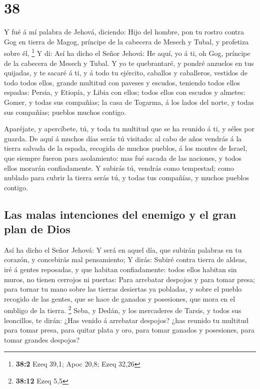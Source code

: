 \hypertarget{section-37}{%
\section{38}\label{section-37}}

 Y fué á mí palabra de Jehová, diciendo:  Hijo
del hombre, pon tu rostro contra Gog en tierra de Magog, príncipe de la
cabecera de Mesech y Tubal, y profetiza sobre él, \footnote{\textbf{38:2}
  Ezeq 39,1; Apoc 20,8; Ezeq 32,26}  Y di: Así ha dicho el
Señor Jehová: He aquí, yo á ti, oh Gog, príncipe de la cabecera de
Mesech y Tubal.  Y yo te quebrantaré, y pondré anzuelos en
tus quijadas, y te sacaré á ti, y á todo tu ejército, caballos y
caballeros, vestidos de todo todos ellos, grande multitud con paveses y
escudos, teniendo todos ellos espadas:  Persia, y Etiopía, y
Libia con ellos; todos ellos con escudos y almetes:  Gomer,
y todas sus compañías; la casa de Togarma, á los lados del norte, y
todas sus compañías; pueblos muchos contigo.

 Aparéjate, y apercíbete, tú, y toda tu multitud que se ha
reunido á ti, y séles por guarda.  De aquí á muchos días
serás tú visitado: al cabo de años vendrás á la tierra salvada de la
espada, recogida de muchos pueblos, á los montes de Israel, que siempre
fueron para asolamiento: mas fué sacada de las naciones, y todos ellos
morarán confiadamente.  Y subirás tú, vendrás como
tempestad; como nublado para cubrir la tierra serás tú, y todas tus
compañías, y muchos pueblos contigo.

\hypertarget{las-malas-intenciones-del-enemigo-y-el-gran-plan-de-dios}{%
\subsection{Las malas intenciones del enemigo y el gran plan de
Dios}\label{las-malas-intenciones-del-enemigo-y-el-gran-plan-de-dios}}

 Así ha dicho el Señor Jehová: Y será en aquel día, que
subirán palabras en tu corazón, y concebirás mal pensamiento;
 Y dirás: Subiré contra tierra de aldeas, iré á gentes
reposadas, y que habitan confiadamente: todos ellos habitan sin muros,
no tienen cerrojos ni puertas:  Para arrebatar despojos y
para tomar presa; para tornar tu mano sobre las tierras desiertas ya
pobladas, y sobre el pueblo recogido de las gentes, que se hace de
ganados y posesiones, que mora en el ombligo de la tierra. \footnote{\textbf{38:12}
  Ezeq 5,5}  Seba, y Dedán, y los mercaderes de Tarsis, y
todos sus leoncillos, te dirán: ¿Has venido á arrebatar despojos? ¿has
reunido tu multitud para tomar presa, para quitar plata y oro, para
tomar ganados y posesiones, para tomar grandes despojos?

